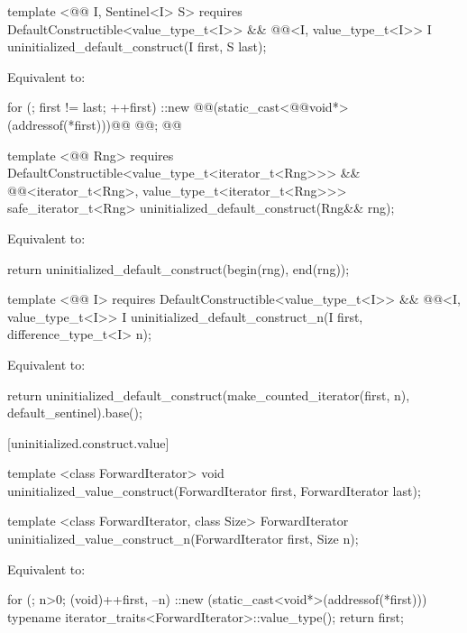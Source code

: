 {\color{addclr}
\begin{codeblock}
template <@@ I, Sentinel<I> S>
requires
  DefaultConstructible<value_type_t<I>> &&
  @@<I, value_type_t<I>>
I uninitialized_default_construct(I first, S last);
\end{codeblock}
} %

\setcounter{Paras}{0}
\pnum
\effects Equivalent to:
\begin{codeblock}
    for (; first != last; ++first)
      ::new @@(static_cast<@@void*>(addressof(*first)))@\added{)}@
        @@;
    @@
\end{codeblock}

{\color{addclr}
\begin{codeblock}
template <@@ Rng>
requires
  DefaultConstructible<value_type_t<iterator_t<Rng>>> &&
  @@<iterator_t<Rng>, value_type_t<iterator_t<Rng>>>
safe_iterator_t<Rng> uninitialized_default_construct(Rng&& rng);
\end{codeblock}

\pnum
\effects Equivalent to:
\begin{codeblock}
        return uninitialized_default_construct(begin(rng), end(rng));
\end{codeblock}

\begin{codeblock}
template <@@ I>
requires DefaultConstructible<value_type_t<I>> &&
  @@<I, value_type_t<I>>
I uninitialized_default_construct_n(I first, difference_type_t<I> n);
\end{codeblock}

\pnum
\effects Equivalent to:
\begin{codeblock}
    return uninitialized_default_construct(make_counted_iterator(first, n),
      default_sentinel{}).base();
\end{codeblock}
} %

[uninitialized.construct.value]{}
{\color{remclr}
\begin{codeblock}
template <class ForwardIterator>
  void uninitialized_value_construct(ForwardIterator first, ForwardIterator last);
\end{codeblock}

\begin{codeblock}
template <class ForwardIterator, class Size>
  ForwardIterator uninitialized_value_construct_n(ForwardIterator first, Size n);
\end{codeblock}
\setcounter{Paras}{1}
\pnum
\effects Equivalent to:
\begin{codeblock}
        for (; n>0; (void)++first, --n)
          ::new (static_cast<void*>(addressof(*first)))
            typename iterator_traits<ForwardIterator>::value_type();
        return first;
\end{codeblock}
} %

